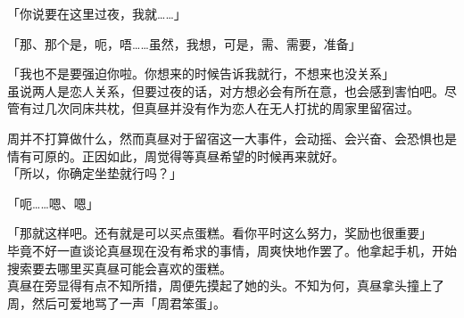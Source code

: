 「你说要在这里过夜，我就……」

「那、那个是，呃，唔……虽然，我想，可是，需、需要，准备」

「我也不是要强迫你啦。你想来的时候告诉我就行，不想来也没关系」\\

虽说两人是恋人关系，但要过夜的话，对方想必会有所在意，也会感到害怕吧。尽管有过几次同床共枕，但真昼并没有作为恋人在无人打扰的周家里留宿过。

周并不打算做什么，然而真昼对于留宿这一大事件，会动摇、会兴奋、会恐惧也是情有可原的。正因如此，周觉得等真昼希望的时候再来就好。\\

「所以，你确定坐垫就行吗？」

「呃……嗯、嗯」

「那就这样吧。还有就是可以买点蛋糕。看你平时这么努力，奖励也很重要」\\

毕竟不好一直谈论真昼现在没有希求的事情，周爽快地作罢了。他拿起手机，开始搜索要去哪里买真昼可能会喜欢的蛋糕。\\

真昼在旁显得有点不知所措，周便先摸起了她的头。不知为何，真昼拿头撞上了周，然后可爱地骂了一声「周君笨蛋」。
